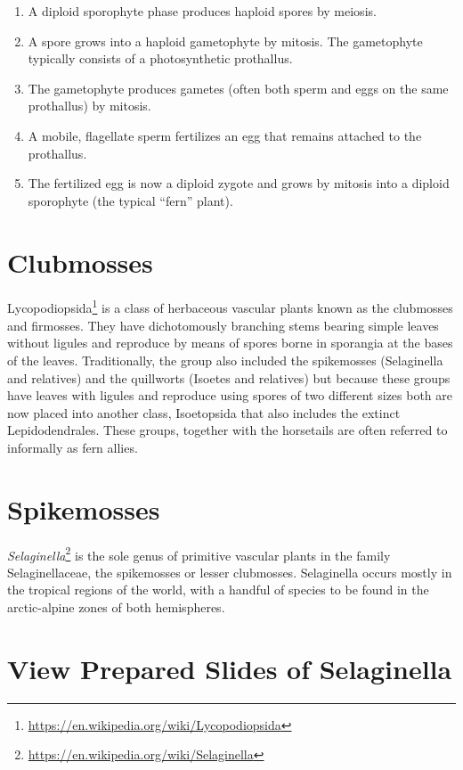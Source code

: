 \documentclass[]{book}
\providecommand{\tightlist}{%
  \setlength{\itemsep}{0pt}\setlength{\parskip}{0pt}}
\let\rmarkdownfootnote\footnote%
\def\footnote{\protect\rmarkdownfootnote}
\renewcommand{\href}[2]{#2\footnote{\url{#1}}}
\theoremstyle{definition}
\theoremstyle{definition}
\theoremstyle{definition}
\theoremstyle{remark}
\begin{document}
\begin{enumerate}
\def\labelenumi{\arabic{enumi}.}
\tightlist
\item
  A diploid sporophyte phase produces haploid spores by meiosis.
\item
  A spore grows into a haploid gametophyte by mitosis. The gametophyte
  typically consists of a photosynthetic prothallus.
\item
  The gametophyte produces gametes (often both sperm and eggs on the
  same prothallus) by mitosis.
\item
  A mobile, flagellate sperm fertilizes an egg that remains attached to
  the prothallus.
\item
  The fertilized egg is now a diploid zygote and grows by mitosis into a
  diploid sporophyte (the typical ``fern'' plant).
\end{enumerate}

\section{Clubmosses}\label{clubmosses}

\href{https://en.wikipedia.org/wiki/Lycopodiopsida}{Lycopodiopsida} is a
class of herbaceous vascular plants known as the clubmosses and
firmosses. They have dichotomously branching stems bearing simple leaves
without ligules and reproduce by means of spores borne in sporangia at
the bases of the leaves. Traditionally, the group also included the
spikemosses (Selaginella and relatives) and the quillworts (Isoetes and
relatives) but because these groups have leaves with ligules and
reproduce using spores of two different sizes both are now placed into
another class, Isoetopsida that also includes the extinct
Lepidodendrales. These groups, together with the horsetails are often
referred to informally as fern allies.

\section{Spikemosses}\label{spikemosses}

\href{https://en.wikipedia.org/wiki/Selaginella}{\emph{Selaginella}} is
the sole genus of primitive vascular plants in the family
Selaginellaceae, the spikemosses or lesser clubmosses. Selaginella
occurs mostly in the tropical regions of the world, with a handful of
species to be found in the arctic-alpine zones of both hemispheres.

\section{View Prepared Slides of
Selaginella}\label{view-prepared-slides-of-selaginella}
\end{document}

